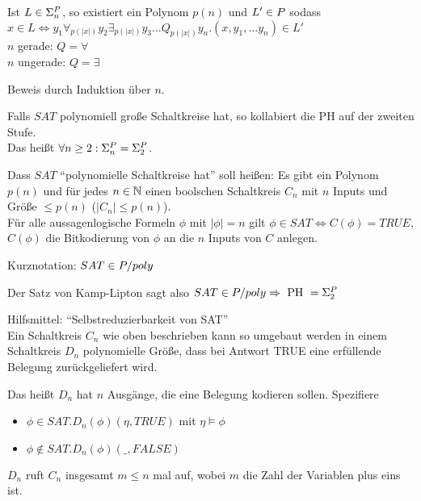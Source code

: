\begin{satz}
    
    Ist $L \in \Sigma_n^{P}$, so existiert ein Polynom $p(n)$ und $L' \in P$ sodass\\
     $x \in L \Leftrightarrow y_1 \forall_{p(|x|)} y_2 \exists_{p(|x|)} y_3 \dots   Q_{p(|x|)} y_n . (x, y_1, \dots y_n) \in L'$\\
    $n$ gerade: $Q = \forall$\\
    $n$ ungerade: $Q = \exists$

\end{satz}

Beweis durch Induktion über $n$.











\begin{satz}


    Falls $SAT$ polynomiell große Schaltkreise hat, so kollabiert die PH auf der zweiten Stufe.\\
    Das heißt $\forall n \geq 2 : \Sigma_n^{P} = \Sigma_2^{P}$.


    Dass $SAT$ ``polynomielle Schaltkreise hat'' soll heißen: Es gibt ein Polynom $p(n)$ und für jedes $n \in \mathbb{N}$ einen boolschen Schaltkreis $C_n$ mit $n$ Inputs und Größe $\leq p(n)$ ($|C_n| \leq p(n)$).\\
    Für alle aussagenlogische Formeln $\phi$ mit $|\phi| = n$ gilt $\phi \in SAT \Leftrightarrow C(\phi) = TRUE$, $C(\phi)$ die Bitkodierung von $\phi$ an die $n$ Inputs von $C$ anlegen.
    
\end{satz}

Kurznotation: $SAT \in P / poly$

Der Satz von Kamp-Lipton sagt also $SAT \in P / poly \Rightarrow \text{ PH } = \Sigma_2^{P}$

Hilfsmittel: ``Selbstreduzierbarkeit von SAT''\\
Ein Schaltkreis $C_n$ wie oben beschrieben kann so umgebaut werden in einem Schaltkreis $D_n$ polynomielle Größe, dass bei Antwort TRUE eine erfüllende Belegung zurückgeliefert wird.

Das heißt $D_n$ hat $n$ Ausgänge, die eine Belegung kodieren sollen. Spezifiere 
\begin{itemize}
    \item 
        $\phi \in SAT . D_n(\phi) (\eta, TRUE)$ mit $\eta \vDash \phi$
    \item 
        $\phi \notin SAT . D_n(\phi) (\_, FALSE)$
\end{itemize}
$D_n$ ruft $C_n$ insgesamt $m \leq n$ mal auf, wobei $m$ die Zahl der Variablen plus eins ist.

